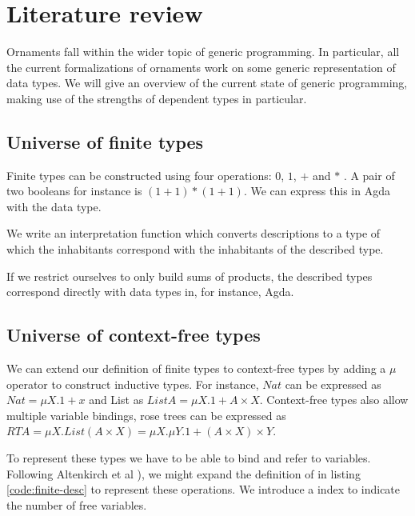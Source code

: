 \section{Literature review}\label{sec:literature-review}

Ornaments fall within the wider topic of generic programming.
In particular, all the current formalizations of ornaments work on
some generic representation of data types.
We will give an overview of the current state of generic programming,
making use of the strengths of dependent types in particular.

\subsection{Universe of finite types}

Finite types can be constructed using four operations: $0$, $1$, $+$ and
$*$ \cite{altenkirch06}.
A pair of two booleans for instance is $(1 + 1) * (1 + 1)$.
We can express this in Agda with the  data type.


We write an interpretation function which converts descriptions to a
type of which the inhabitants correspond with the inhabitants of the
described type.


If we restrict ourselves to only build sums of products, the described
types correspond directly with data types in, for instance, Agda.

\subsection{Universe of context-free types}

We can extend our definition of finite types to context-free types by
adding a $μ$ operator to construct inductive types.
For instance, $Nat$ can be expressed as $Nat = μX. 1 + x$ and List as $List
A = μX. 1 + A × X$.
Context-free types also allow multiple variable bindings, rose trees
can be expressed as $RT A = μX. List (A × X) = μX. μY. 1 + (A × X) × Y$.

To represent these types we have to be able to bind and refer to
variables.
Following Altenkirch et al \cite{altenkirch06}), we might expand the
definition of  in listing \ref{code:finite-desc} to represent
these operations.
We introduce a  index to indicate the number of free variables.

